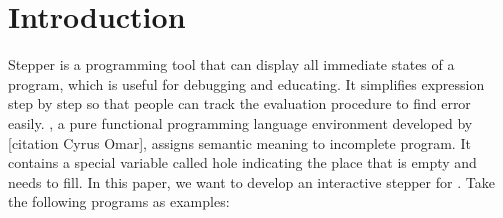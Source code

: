 \section{Introduction}
\label{sec:intro}

Stepper is a programming tool that can display all immediate states of a program, which is useful for debugging and educating. It simplifies expression step by step so that people can track the evaluation procedure to find error easily. \Hazel, a pure functional programming language environment developed by [citation Cyrus Omar], assigns semantic meaning to incomplete program. It contains a special variable called hole indicating the place that is empty and needs to fill. In this paper, we want to develop an interactive stepper for \Hazel. Take the following programs as examples:

